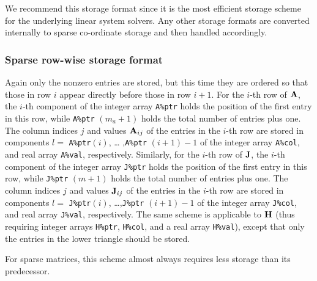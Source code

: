 \documentclass{galahad}
\begin{document}
We recommend this storage format since it is the most efficient
storage scheme for the underlying linear system solvers.  Any other
storage formats are converted internally to sparse co-ordinate
storage and then handled accordingly.

\subsubsection{Sparse row-wise storage format}\label{rowwise}
Again only the nonzero entries are stored, but this time they are
ordered so that those in row $i$ appear directly before those in row
$i+1$. For the $i$-th row of ${\mathbf{A}}$, the $i$-th component of the integer
array {\tt A\%ptr} holds the position of the first entry in this row,
while {\tt A\%ptr} $(m_a+1)$ holds the total number of entries plus one.
The column indices $j$ and values ${\mathbf{A}}_{ij}$ of the entries in the
$i$-th row are stored in components $l =$ {\tt A\%ptr}$(i)$, \ldots
,{\tt A\%ptr} $(i+1)-1$ of the integer array {\tt A\%col}, and real
array {\tt A\%val}, respectively.  Similarly, for the $i$-th row of
${\mathbf{J}}$, the $i$-th component of the integer array {\tt J\%ptr} holds the
position of the first entry in this row, while {\tt J\%ptr} $(m+1)$
holds the total number of entries plus one.  The column indices $j$
and values ${\mathbf{J}}_{ij}$ of the entries in the $i$-th row are stored in
components $l =$ {\tt J\%ptr}$(i)$, \ldots ,{\tt J\%ptr} $(i+1)-1$ of
the integer array {\tt J\%col}, and real array {\tt J\%val},
respectively.  The same scheme is applicable to
${\mathbf{H}}$ (thus requiring integer arrays {\tt H\%ptr}, {\tt H\%col}, and 
a real array {\tt H\%val}),
except that only the entries in the lower triangle should be stored.

For sparse matrices, this scheme almost always requires less storage than 
its predecessor.
\end{document}
